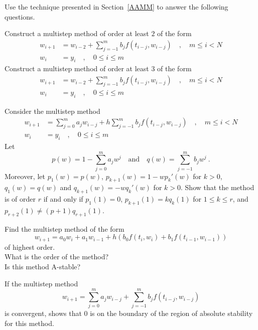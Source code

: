 \begin{question}
Use the technique presented in Section~\ref{AAMM} to answer the
following questions.

 Construct a multistep method of order at least $2$
of the form
\begin{align*}
w_{i+1} &= w_{i-2} + \sum_{j=-1}^m b_j f(t_{i-j},w_{i-j}) \quad ,
\quad  m \leq i < N \\
w_i &= y_i \quad , \quad 0 \leq i \leq m
\end{align*}
 Construct a multistep method of order at least $3$
of the form
\begin{align*}
w_{i+1} &= w_{i-2} + \sum_{j=-1}^m b_j f(t_{i-j},w_{i-j}) \quad ,
\quad m \leq i < N \\
w_i &= y_i \quad , \quad 0 \leq i \leq m
\end{align*}
\label{initQ17}
\end{question}

\begin{question}
Consider the multistep method
\begin{align*}
w_{i+1} &= \sum_{j=0}^m a_j w_{i-j} + h \sum_{j=-1}^m b_j f(t_{i-j},w_{i-j})
\quad , \quad m \leq i < N \\
w_i&= y_i \quad , \quad 0 \leq i \leq m
\end{align*}
Let
\[
p(w) = 1 - \sum_{j=0}^m a_j w^j \quad \text{and} \quad
q(w) = \sum_{j=-1}^m  b_j w^j \ .
\]
Moreover, let $p_1(w) = p(w)$, $p_{k+1}(w) = 1 -w p_k'(w)$ for $k>0$,
$q_1(w) = q(w)$ and $q_{k+1}(w) = -w q_k'(w)$ for $k>0$.
Show that the method is of order $r$ if and only if
$p_1(1)=0$, $p_{k+1}(1)= k q_k(1)$ for $1 \leq k \leq r$, and
$p_{r+2}(1)\neq (p+1) q_{r+1}(1)$.
\label{initQ18}
\end{question}

\begin{question}
 Find the multistep method of the form
\[
w_{i+1} = a_0 w_i + a_1 w_{i-1} + h \left( b_0
  f(t_i,w_i) + b_1 f(t_{i-1},w_{i-1}) \right)
\]
of highest order.\\
 What is the order of the method?\\
 Is this method A-stable?
\label{initQ19}
\end{question}

\begin{question}
If the multistep method
\[
w_{i+1} = \sum_{j=0}^m a_j w_{i-j} + \sum_{j=-1}^m b_j f(t_{i-j},w_{i-j})
\]
is convergent, shows that $0$ is on the boundary of the region of
absolute stability for this method.
\label{initQ20}
\end{question}

